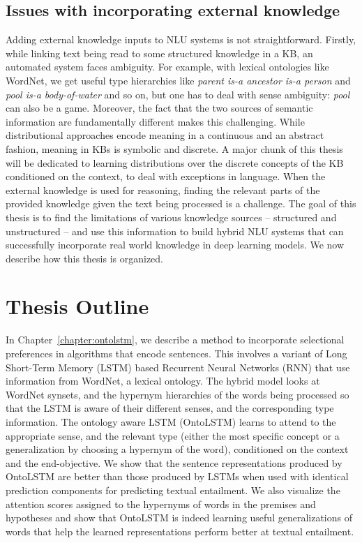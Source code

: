 \subsection{Issues with incorporating external knowledge}
Adding external knowledge inputs to NLU systems is not straightforward.  Firstly, while linking text being read to some structured knowledge
in a KB, an automated system faces ambiguity. For example, with lexical ontologies like WordNet, 
we get useful type hierarchies like \textit{parent is-a ancestor is-a person} and \textit{pool is-a body-of-water} 
and so on, but one has to deal with sense ambiguity: \textit{pool} can also be a game. Moreover, the fact that the two sources of semantic information are fundamentally different 
makes this challenging. While distributional approaches encode meaning in a
continuous and an abstract fashion, meaning in KBs is symbolic and discrete. A major chunk of this thesis will be dedicated to learning 
distributions over the discrete concepts of the KB conditioned on the context, to deal with exceptions in language.
When the external knowledge is used for reasoning, finding the 
relevant parts of the provided knowledge given the text being processed is a challenge. 
The goal of this thesis is to find the limitations of various knowledge sources -- structured and unstructured -- and use this information 
to build hybrid NLU systems that can successfully incorporate real world knowledge in deep learning models. We now describe how this thesis is organized.

\section{Thesis Outline}
In Chapter~\ref{chapter:ontolstm}, we describe a method to incorporate selectional 
preferences in algorithms that encode sentences. This involves a variant of Long Short-Term
Memory (LSTM) based Recurrent Neural Networks (RNN) that use information
from WordNet, a lexical 
ontology. The hybrid model looks at WordNet synsets, and the hypernym hierarchies of the
words being processed so that the 
LSTM is aware of their different senses, and the corresponding type information.
The ontology aware LSTM (OntoLSTM) learns to attend to the appropriate sense,
and the relevant type 
(either the most specific concept or a generalization by choosing a hypernym of
the word), conditioned on the context and the end-objective. We show that the sentence representations 
produced by OntoLSTM are better than those produced by LSTMs when used with identical prediction 
components for predicting textual entailment. We also visualize the attention scores assigned to the hypernyms 
of words in the premises and hypotheses and show that OntoLSTM is indeed learning useful generalizations of words
that help the learned representations perform better at textual entailment.

